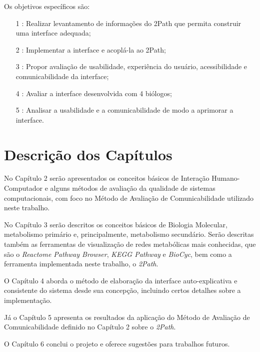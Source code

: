 \indent Os objetivos específicos são:
\begin{itemize}
\item[1]: Realizar levantamento de informações do 2Path que permita construir uma interface adequada;
\item[2]: Implementar a interface e acoplá-la ao 2Path;
\item[3]: Propor avaliação de usabilidade, experiência do usuário, acessibilidade e comunicabilidade da interface;
\item[4]: Avaliar a interface desenvolvida com 4 biólogos;
\item[5]: Analisar a usabilidade e a comunicabilidade de modo a aprimorar a interface.
\end{itemize}

\section{Descrição dos Capítulos}
\indent No Capítulo 2 serão apresentados os conceitos básicos de Interação Humano-Computador e alguns métodos de avaliação da qualidade de sistemas computacionais, com foco no Método de Avaliação de Comunicabilidade utilizado neste trabalho.

\indent No Capítulo 3 serão descritos os conceitos básicos de Biologia Molecular, metabolismo primário e, principalmente, metabolismo secundário. Serão descritas também as ferramentas de visualização de redes metabólicas mais conhecidas, que são o \textit{Reactome Pathway Browser}, \textit{KEGG Pathway} e \textit{BioCyc}, bem como a ferramenta implementada neste trabalho, o \textit{2Path}.

\indent O Capítulo 4 aborda o método de elaboração da interface auto-explicativa e consistente do sistema desde sua concepção, incluindo certos detalhes sobre a implementação.

\indent Já o Capítulo 5 apresenta os resultados da aplicação do Método de Avaliação de Comunicabilidade definido no Capítulo 2 sobre o \textit{2Path}.

\indent O Capítulo 6  conclui o projeto e oferece sugestões para trabalhos futuros.